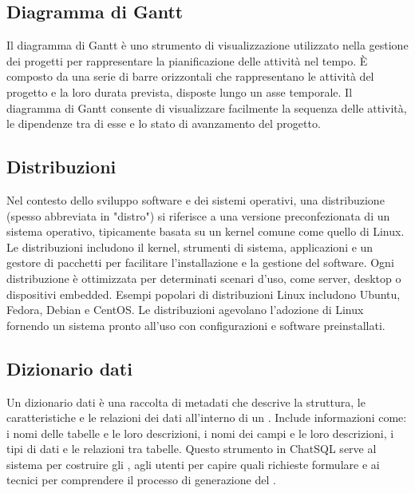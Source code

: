 \vspace{2em}
\subsection*{Diagramma di Gantt}
\par Il diagramma di Gantt è uno strumento di visualizzazione utilizzato nella gestione dei progetti per rappresentare la pianificazione delle attività nel tempo. È composto da una serie di barre orizzontali che rappresentano le attività del progetto e la loro durata prevista, disposte lungo un asse temporale. Il diagramma di Gantt consente di visualizzare facilmente la sequenza delle attività, le dipendenze tra di esse e lo stato di avanzamento del progetto.

\vspace{2em}
\subsection*{Distribuzioni}
\par Nel contesto dello sviluppo software e dei sistemi operativi, una distribuzione (spesso abbreviata in "distro") si riferisce a una versione preconfezionata di un sistema operativo, tipicamente basata su un kernel comune come quello di Linux. Le distribuzioni includono il kernel, strumenti di sistema, applicazioni e un gestore di pacchetti per facilitare l'installazione e la gestione del software. Ogni distribuzione è ottimizzata per determinati scenari d'uso, come server, desktop o dispositivi embedded. Esempi popolari di distribuzioni Linux includono Ubuntu, Fedora, Debian e CentOS. Le distribuzioni agevolano l'adozione di Linux fornendo un sistema pronto all'uso con configurazioni e software preinstallati.

\vspace{2em}
\subsection*{Dizionario dati}
\par Un dizionario dati è una raccolta di metadati che descrive la struttura, le caratteristiche e le relazioni dei dati all'interno di un . Include informazioni come: i nomi delle tabelle e le loro descrizioni, i nomi dei campi e le loro descrizioni, i tipi di dati e le relazioni tra tabelle. Questo strumento in ChatSQL serve al sistema per costruire gli , agli utenti per capire quali richieste formulare e ai tecnici per comprendere il processo di generazione del .


